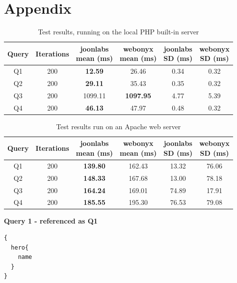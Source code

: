 \documentclass[11pt, a4paper]{article}
\begin{document}
\clearpage
\section{Appendix}


\begin{table}[H]
\centering
\begin{tabular}{ |c||c||c|c||c|c|  }
 \hline
Query & Iterations & \makecell{\textbf{joonlabs}\\mean (ms)} & \makecell{\textbf{webonyx}\\mean (ms)} & \makecell{\textbf{joonlabs}\\SD (ms)} & \makecell{\textbf{webonyx}\\SD (ms)} \\
 \hline
 Q1 & 200 & \textbf{12.59} & 26.46 & 0.34 & 0.32\\
 Q2 & 200 & \textbf{29.11} & 35.43 & 0.35 & 0.32\\
 Q3 & 200 & 1099.11 & \textbf{1097.95} & 4.77 & 5.39\\
 Q4 & 200 & \textbf{46.13} & 47.97 & 0.48 & 0.32\\
 \hline
\end{tabular}
\caption{Test results, running on the local PHP built-in server}
\label{table_1}
\end{table}


\begin{table}[H]
\centering
\begin{tabular}{ |c||c||c|c||c|c|  }
 \hline
Query & Iterations & \makecell{\textbf{joonlabs}\\mean (ms)} & \makecell{\textbf{webonyx}\\mean (ms)} & \makecell{\textbf{joonlabs}\\SD (ms)} & \makecell{\textbf{webonyx}\\SD (ms)} \\
 \hline
 Q1 & 200 & \textbf{139.80} & 162.43 & 13.32 & 76.06\\
 Q2 & 200 & \textbf{148.33} & 167.68 & 13.00 & 78.18\\
 Q3 & 200 & \textbf{164.24} & 169.01 & 74.89 & 17.91\\
 Q4 & 200 & \textbf{185.55} & 195.30 & 76.53 & 79.08\\
 \hline
\end{tabular}
\caption{Test results run on an Apache web server}
\label{table_2}
\end{table}

\clearpage

\textbf{Query 1 - referenced as Q1}
\begin{verbatim}
{
  hero{
    name
  }
}
\end{verbatim}
\end{document}
